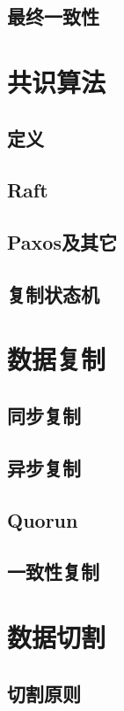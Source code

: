\documentclass[reqno,heading=true,fontset=macnew]{ctexbook}
\begin{document}
\section{最终一致性}


\chapter{共识算法}
\section{定义}

\section{Raft}
\section{Paxos及其它}

\section{复制状态机}


\chapter{数据复制}
\section{同步复制}

\section{异步复制}

\section{Quorun}

\section{一致性复制}


\chapter{数据切割}
\section{切割原则}
\end{document}
